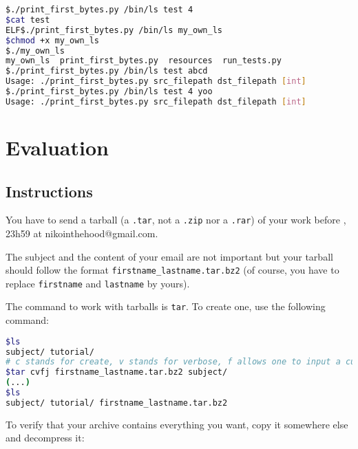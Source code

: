 \documentclass[12pt]{article}
\begin{document}
\begin{lstlisting}[language=bash]
$./print_first_bytes.py /bin/ls test 4
$cat test 
ELF$./print_first_bytes.py /bin/ls my_own_ls
$chmod +x my_own_ls 
$./my_own_ls 
my_own_ls  print_first_bytes.py  resources  run_tests.py
$./print_first_bytes.py /bin/ls test abcd
Usage: ./print_first_bytes.py src_filepath dst_filepath [int]
$./print_first_bytes.py /bin/ls test 4 yoo
Usage: ./print_first_bytes.py src_filepath dst_filepath [int]
\end{lstlisting}

\section{Evaluation}
\subsection{Instructions}

You have to send a tarball (a \texttt{.tar}, not a \texttt{.zip} nor a \texttt{.rar}) of your work before , 23h59 at nikointhehood@gmail.com.

The subject and the content of your email are not important but your tarball should follow the format \texttt{firstname\_lastname.tar.bz2} (of course, you have to replace \texttt{firstname} and \texttt{lastname} by yours).

The command to work with tarballs is \texttt{tar}. To create one, use the following command:

\begin{lstlisting}[language=bash]
$ls
subject/ tutorial/
# c stands for create, v stands for verbose, f allows one to input a custom name for the archive and j indicates the usage of bzip2
$tar cvfj firstname_lastname.tar.bz2 subject/
(...)
$ls
subject/ tutorial/ firstname_lastname.tar.bz2
\end{lstlisting}

To verify that your archive contains everything you want, copy it somewhere else and decompress it:
\end{document}
